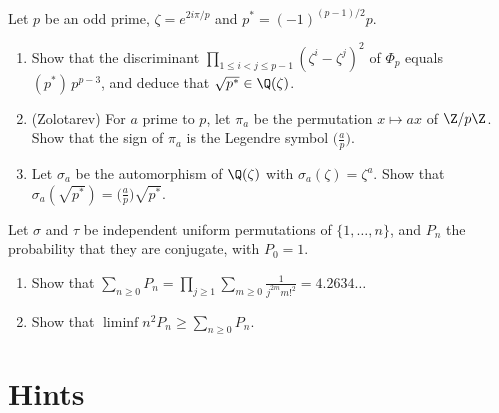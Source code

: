 \begin{exercise}[$\star\star\star$]\label{pb:discphi}
Let $p$ be an odd prime, $\zeta=e^{2i\pi/p}$ and $p^*=(-1)^{(p-1)/2}p$.
\begin{enumerate}[label=(\alph*)]
\item Show that the discriminant $\prod_{1\le i<j\le p-1}(\zeta^i-\zeta^j)^2$ of $\Phi_p$ equals $(p^*)\,p^{p-3}$, and
deduce that $\sqrt{p^*}\in\Q(\zeta)$.
\item (Zolotarev) For $a$ prime to $p$, let $\pi_a$ be the permutation $x\mapsto ax$ of $\Z/p\Z$. Show that the sign of
$\pi_a$ is the Legendre symbol $\bigl(\frac ap\bigr)$.
\item Let $\sigma_a$ be the automorphism of $\Q(\zeta)$ with $\sigma_a(\zeta)=\zeta^a$. Show that
$\sigma_a(\sqrt{p^*})=\bigl(\frac ap\bigr)\sqrt{p^*}$.
\end{enumerate}
\end{exercise}

\begin{exercise}[$\star\star$]\label{pb:conjugate}
Let $\sigma$ and $\tau$ be independent uniform permutations of $\{1,\dots,n\}$, and $P_n$ the probability that they are
conjugate, with $P_0=1$.
\begin{enumerate}[label=(\alph*)]
\item Show that $\sum_{n\ge0}P_n=\prod_{j\ge1}\sum_{m\ge0}\frac1{j^{2m}m!^2}=4.2634\ldots$
\item Show that $\liminf n^2P_n\ge\sum_{n\ge0}P_n$.
\end{enumerate}
\end{exercise}

\section{Hints}

